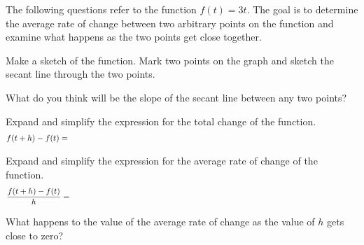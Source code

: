 \begin{problem}
  \item The following questions refer to the function $f(t)=3t$.
    The goal is to determine the average rate of change between
    two arbitrary points on the function and examine what happens
    as the two points get close together.
    \begin{subproblem}
      \item  Make a sketch of the function. Mark two points on the
        graph and sketch the secant line through the two points.
        \vfill
      \item What do you think will be the slope of the secant line
        between any two points?
        \vspace{1em}
      \item Expand and simplify the expression for the total change
        of the function.
        \begin{eqnarray*}
          f(t+h)-f(t) & = & \hskip \textwidth
        \end{eqnarray*}
        \vfill
      \item Expand and simplify the expression for the average rate
        of change of the function.
      \begin{eqnarray*}
        \frac{f(t+h)-f(t)}{h} & = & \hskip \textwidth
      \end{eqnarray*}
      \vfill
    \item What happens to the value of the average rate of change as
      the value of $h$ gets close to zero?
      \vspace{3em}
    \end{subproblem}

  \clearpage


\end{problem}

